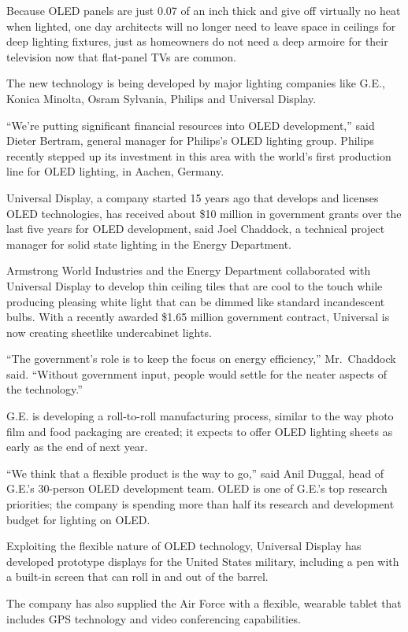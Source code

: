 ﻿\documentclass[12pt]{article}
\begin{document}
Because OLED panels are just 0.07 of an inch thick and give off virtually no heat when lighted, one
day architects will no longer need to leave space in ceilings for deep lighting fixtures, just as
homeowners do not need a deep armoire for their television now that flat-panel TVs are common.

The new technology is being developed by major lighting companies like G.E., Konica Minolta, Osram
Sylvania, Philips and Universal Display.

``We're putting significant financial resources into OLED development,'' said Dieter Bertram,
general manager for Philips's OLED lighting group. Philips recently stepped up its investment in
this area with the world's first production line for OLED lighting, in Aachen, Germany.

Universal Display, a company started 15 years ago that develops and licenses OLED technologies, has
received about \$10 million in government grants over the last five years for OLED development, said
Joel Chaddock, a technical project manager for solid state lighting in the Energy Department.

Armstrong World Industries and the Energy Department collaborated with Universal Display to develop
thin ceiling tiles that are cool to the touch while producing pleasing white light that can be
dimmed like standard incandescent bulbs. With a recently awarded \$1.65 million government contract,
Universal is now creating sheetlike undercabinet lights.

``The government's role is to keep the focus on energy efficiency,'' Mr.~Chaddock said. ``Without
government input, people would settle for the neater aspects of the technology.''

G.E. is developing a roll-to-roll manufacturing process, similar to the way photo film and food
packaging are created; it expects to offer OLED lighting sheets as early as the end of next year.

``We think that a flexible product is the way to go,'' said Anil Duggal, head of G.E.'s 30-person
OLED development team. OLED is one of G.E.'s top research priorities; the company is spending more
than half its research and development budget for lighting on OLED.

Exploiting the flexible nature of OLED technology, Universal Display has developed prototype
displays for the United States military, including a pen with a built-in screen that can roll in and
out of the barrel.

The company has also supplied the Air Force with a flexible, wearable tablet that includes GPS
technology and video conferencing capabilities.
\end{document}
